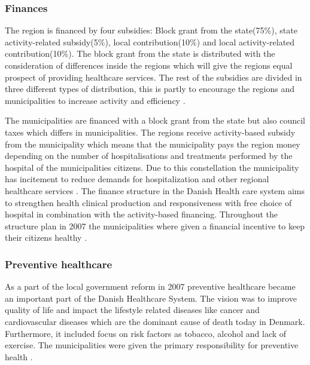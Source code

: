 





\subsubsection{Finances}

The region is financed by four subsidies: Block grant from the state(75\%), state activity-related subsidy(5\%), local contribution(10\%) and local activity-related contribution(10\%). The block grant from the state is distributed with the consideration of differences inside the regions which will give the regions equal prospect of providing healthcare services. The rest of the subsidies are divided in three different types of distribution, this is partly to encourage the regions and municipalities to increase activity and efficiency \cite{sundhedsministeriet}.

The municipalities are financed with a block grant from the state but also council taxes which differs in municipalities. The regions receive activity-based subsidy from the municipality which means that the municipality pays the region money depending on the number of hospitalisations and treatments performed by the hospital of the municipalities citizens. Due to this constellation the municipality has incitement to reduce demands for hospitalization and other regional healthcare services \cite{Healthcareindk2}.
The finance structure in the Danish Health care system aims to strengthen health clinical production and responsiveness with free choice of hospital in combination with the activity-based financing. Throughout the structure plan in 2007 the municipalities where given a financial incentive to keep their citizens healthy \cite{DKhealthreview}.



\subsubsection{Preventive healthcare}

As a part of the local government reform in 2007 preventive healthcare became an important part of the Danish Healthcare System. The vision was to improve quality of life and impact the lifestyle related diseases like cancer and cardiovascular diseases which are the dominant cause of death today in Denmark. Furthermore, it included focus on risk factors as tobacco, alcohol and lack of exercise. The municipalities were given the primary responsibility for preventive health \cite{sundhedsministeriet}.


